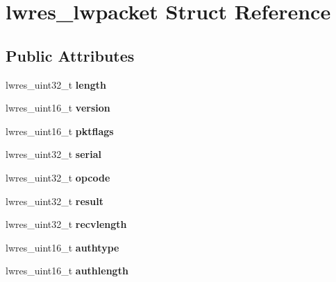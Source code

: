\hypertarget{structlwres__lwpacket}{
\section{lwres\_\-lwpacket Struct Reference}
\label{structlwres__lwpacket}
}
\subsection*{Public Attributes}
\begin{DoxyCompactItemize}
\item 
\hypertarget{structlwres__lwpacket_af79aea2f4171e53a4f648b5ce3a3b51d}{
lwres\_\-uint32\_\-t {\bfseries length}}
\label{structlwres__lwpacket_af79aea2f4171e53a4f648b5ce3a3b51d}

\item 
\hypertarget{structlwres__lwpacket_a31fad934aedbd6938806c852b4dd014c}{
lwres\_\-uint16\_\-t {\bfseries version}}
\label{structlwres__lwpacket_a31fad934aedbd6938806c852b4dd014c}

\item 
\hypertarget{structlwres__lwpacket_ada92a7676702c6425c9e1f95901d382c}{
lwres\_\-uint16\_\-t {\bfseries pktflags}}
\label{structlwres__lwpacket_ada92a7676702c6425c9e1f95901d382c}

\item 
\hypertarget{structlwres__lwpacket_a59f5ec3d121a0376c0d3d978910e7e3a}{
lwres\_\-uint32\_\-t {\bfseries serial}}
\label{structlwres__lwpacket_a59f5ec3d121a0376c0d3d978910e7e3a}

\item 
\hypertarget{structlwres__lwpacket_a522440e04136d55a78d991de4ed2753c}{
lwres\_\-uint32\_\-t {\bfseries opcode}}
\label{structlwres__lwpacket_a522440e04136d55a78d991de4ed2753c}

\item 
\hypertarget{structlwres__lwpacket_a4229003d5696d084f6826afc292fd87c}{
lwres\_\-uint32\_\-t {\bfseries result}}
\label{structlwres__lwpacket_a4229003d5696d084f6826afc292fd87c}

\item 
\hypertarget{structlwres__lwpacket_a322f9ee14514e0d1d9880ff71badf499}{
lwres\_\-uint32\_\-t {\bfseries recvlength}}
\label{structlwres__lwpacket_a322f9ee14514e0d1d9880ff71badf499}

\item 
\hypertarget{structlwres__lwpacket_acc1bcb7084828baaee10173facfc98e0}{
lwres\_\-uint16\_\-t {\bfseries authtype}}
\label{structlwres__lwpacket_acc1bcb7084828baaee10173facfc98e0}

\item 
\hypertarget{structlwres__lwpacket_ad4f52f89f5cb6f7b2880cab230e3ae9a}{
lwres\_\-uint16\_\-t {\bfseries authlength}}
\label{structlwres__lwpacket_ad4f52f89f5cb6f7b2880cab230e3ae9a}

\end{DoxyCompactItemize}


